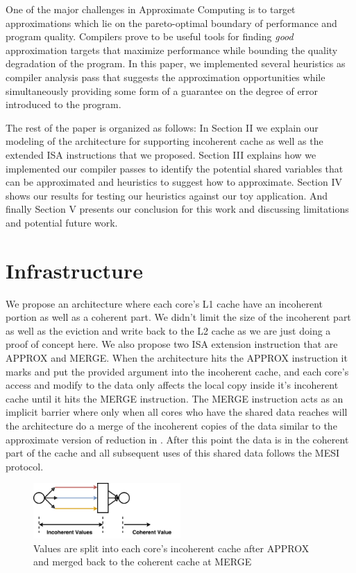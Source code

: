 \documentclass[12pt,conference]{IEEEtran}
\begin{document}
One of the major challenges in Approximate Computing is 
to target approximations which lie on the pareto-optimal
boundary of performance and program quality. Compilers prove
to be useful tools for finding \emph{good} approximation 
targets that maximize performance while bounding the
quality degradation of the program. In this paper, we implemented several 
heuristics as compiler analysis pass that suggests the approximation
opportunities while simultaneously providing some form of a guarantee on the
degree of error introduced to the program.

The rest of the paper is organized as follows: In Section II we explain our 
modeling of the architecture for supporting incoherent cache as well as the
extended ISA instructions that we proposed. Section III explains how we implemented
our compiler passes to identify the potential shared variables that can be
approximated and heuristics to suggest how to approximate. Section IV
shows our results for testing our heuristics against our toy application. And 
finally Section V presents our conclusion for this work and discussing limitations
and potential future work.

\section{Infrastructure}

We propose an architecture where each core's L1 cache have an incoherent
portion as well as a coherent part. We didn't limit the size of the 
incoherent part as well as the eviction and write back to the L2 cache as
we are just doing a proof of concept here. We also propose two ISA extension
instruction that are APPROX and MERGE. When the architecture hits the 
APPROX instruction it marks and put the provided argument into the incoherent
cache, and each core's access and modify to the data only affects the local
copy inside it's incoherent cache until it hits the MERGE instruction. The
MERGE instruction acts as an implicit barrier where only when all cores
who have the shared data reaches will the architecture do a merge of the
incoherent copies of the data similar to the approximate version of reduction
in \cite{paraprox}. After this point the data is in the coherent part of the
cache and all subsequent uses of this shared data follows the MESI protocol.
\begin{figure}[h]
    \centering
    \includegraphics[width=0.50\textwidth]{incoherent.pdf}
    \caption{Values are split into each core's incoherent cache after APPROX and merged back to the coherent cache at MERGE}
    \label{fig:incoherent}
\end{figure}
\end{document}
